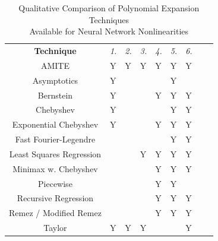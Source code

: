 \begin{table}[t]
	\renewcommand{\arraystretch}{1.35}
	\caption{Qualitative Comparison of Polynomial Expansion Techniques \\
		Available for Neural Network Nonlinearities
	    \vspace{1mm}}
	\label{table_qualitative_comparison}
	\centering
	\begin{tabularx}{0.98\textwidth}{
			|c|
			| >{\centering\arraybackslash}X
			| >{\centering\arraybackslash}X
			| >{\centering\arraybackslash}X
			| >{\centering\arraybackslash}X
			| >{\centering\arraybackslash}X
			| >{\centering\arraybackslash}X
			| >{\centering\arraybackslash}X
			| >{\centering\arraybackslash}X
			| }
		\hline
		&
		\multicolumn{6}{c|}{\textbf{Properties}} \\
		\hline
		\textbf{Technique}
		& \textit{1.}
		& \textit{2.}
		& \textit{3.}
		& \textit{4.}
		& \textit{5.}
		& \textit{6.} \\
		\hline
		\hline
		AMITE                                                   & Y & Y & Y & Y & Y & Y \\
		\hline
		\hline
		Asymptotics \cite{noauthor_hyperbolic_nodate}           & Y & \ & \ & \ & Y & \ \\
		\hline
		Bernstein \cite{huang_reachnn:_2019}                    & Y & \ & \ & Y & Y & Y \\
		\hline
		Chebyshev \cite{vlcek_chebyshev_2012}                   & Y & \ & \ & \ & Y & Y \\
		\hline
		Exponential Chebyshev \cite{koc_new_2013}               & Y & \ & \ & Y & Y & Y \\
		\hline
		Fast Fourier-Legendre \cite{alpert_fast_1991}           & \ & \ & \ & \ & Y & Y \\ 
		\hline
		Least Squares Regression \cite{obla_effective_2020}     & \ & \ & Y & Y & Y & Y \\
		\hline
		Minimax w. Chebyshev \cite{obla_effective_2020, lee_near-optimal_2020} 
		& \ & \ & \ & Y & Y & Y \\
		\hline
		Piecewise \cite{baptista_low-resource_2013}             & \ & \ & \ & Y & Y & \ \\
		\hline
		Recursive Regression \cite{dutta_reachability_2019}     & \ & \ & \ & Y & Y & Y \\
		\hline
		Remez / Modified Remez \cite{lee_high-precision_2020, lee_high-precision_2020-1}
		& \ & \ & \ & Y & Y & Y \\
		\hline
		Taylor\cite{bateman_higher_1953}                        & Y & Y & Y & \ & \ & Y \\
		\hline
		
		\hline
	\end{tabularx}
\end{table}

